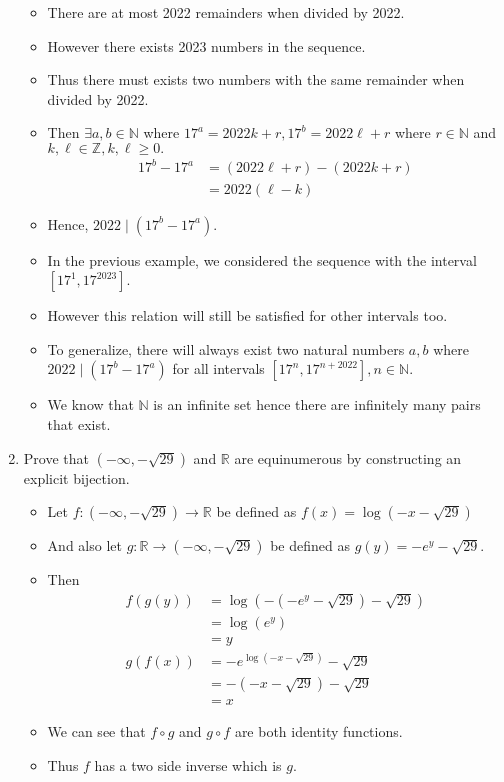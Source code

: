 \documentclass[letterpaper,12pt]{article}
\begin{document}
\begin{enumerate}
\begin{itemize}
	\item There are at most 2022 remainders when divided by 2022.
	\item However there exists 2023 numbers in the sequence.
	\item Thus there must exists two numbers with the same remainder when divided by 2022. 
	\item Then $\exists a,b \in \mathbb{N}$ where $17^a = 2022k+r,17^b=2022\ell + r$ where $r \in \mathbb{N}$ and $k,\ell \in \mathbb{Z} , k,\ell \geq 0.$
	\begin{align}
		17^b-17^a &= (2022\ell + r) - (2022k+r) \\&=2022(\ell-k)
	\end{align}
	\item Hence, $2022 \mid (17^b-17^a).$
	\item In the previous example, we considered the sequence with the interval $[17^1,17^{2023}]$.
	\item However this relation will still be satisfied for other intervals too.
	\item To generalize, there will always exist two natural numbers $a,b$ where $2022 \mid (17^b-17^a)$ for all intervals $[17^n,17^{n+2022}],n\in \mathbb{N}.$
	\item We know that $\mathbb{N}$ is an infinite set hence there are infinitely many pairs that exist.
\end{itemize}
\item Prove that $(-\infty,-\sqrt{29})$ and $\mathbb{R}$ are equinumerous by constructing an explicit bijection.
\begin{itemize}
	\item Let $f:(-\infty,-\sqrt{29}) \rightarrow \mathbb{R}$ be defined as $f(x) = \log(-x-\sqrt{29})$
	\item And also let $g:\mathbb{R} \rightarrow(-\infty,-\sqrt{29})$ be defined as $g(y)=-e^y-\sqrt{29}.$
	\item Then 
	\begin{align}
		f(g(y)) &= \log(-(-e^y-\sqrt{29})-\sqrt{29}) \\ &=\log(e^y) \\&=y \\ g(f(x))&=-e^{\log(-x-\sqrt{29})}-\sqrt{29} \\&=-(-x-\sqrt{29}) -\sqrt{29} \\&=x
	\end{align}
	\item We can see that $f\circ g$ and $g \circ f$ are both identity functions.
	\item Thus $f$ has a two side inverse which is $g$.

\end{itemize}
\end{enumerate}
\end{document}

